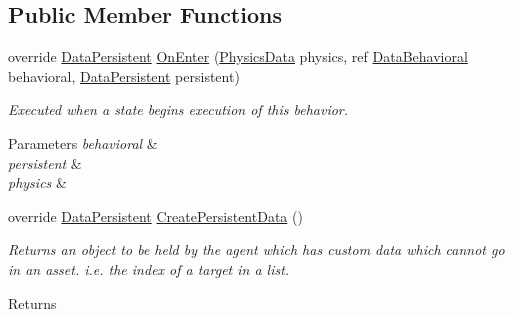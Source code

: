 \subsection*{Public Member Functions}
\begin{DoxyCompactItemize}
\item 
\hypertarget{class_skyrates_1_1_a_i_1_1_target_1_1_waypoint_targets_a807c7dd3e9a647732e7b74e1a4276fc9}{override \hyperlink{class_skyrates_1_1_a_i_1_1_behavior_1_1_data_persistent}{Data\-Persistent} \hyperlink{class_skyrates_1_1_a_i_1_1_target_1_1_waypoint_targets_a807c7dd3e9a647732e7b74e1a4276fc9}{On\-Enter} (\hyperlink{class_skyrates_1_1_physics_1_1_physics_data}{Physics\-Data} physics, ref \hyperlink{class_skyrates_1_1_a_i_1_1_behavior_1_1_data_behavioral}{Data\-Behavioral} behavioral, \hyperlink{class_skyrates_1_1_a_i_1_1_behavior_1_1_data_persistent}{Data\-Persistent} persistent)}\label{class_skyrates_1_1_a_i_1_1_target_1_1_waypoint_targets_a807c7dd3e9a647732e7b74e1a4276fc9}

\begin{DoxyCompactList}\small\item\em Executed when a state begins execution of this behavior. 


\begin{DoxyParams}{Parameters}
{\em behavioral} & \\
\hline
{\em persistent} & \\
\hline
{\em physics} & \\
\hline
\end{DoxyParams}
 \end{DoxyCompactList}\item 
\hypertarget{class_skyrates_1_1_a_i_1_1_target_1_1_waypoint_targets_a612b760a5fa7fc86e73710bc8cea7aef}{override \hyperlink{class_skyrates_1_1_a_i_1_1_behavior_1_1_data_persistent}{Data\-Persistent} \hyperlink{class_skyrates_1_1_a_i_1_1_target_1_1_waypoint_targets_a612b760a5fa7fc86e73710bc8cea7aef}{Create\-Persistent\-Data} ()}\label{class_skyrates_1_1_a_i_1_1_target_1_1_waypoint_targets_a612b760a5fa7fc86e73710bc8cea7aef}

\begin{DoxyCompactList}\small\item\em Returns an object to be held by the agent which has custom data which cannot go in an asset. i.\-e. the index of a target in a list. 

\begin{DoxyReturn}{Returns}

\end{DoxyReturn}
 \end{DoxyCompactList}\end{DoxyCompactItemize}
